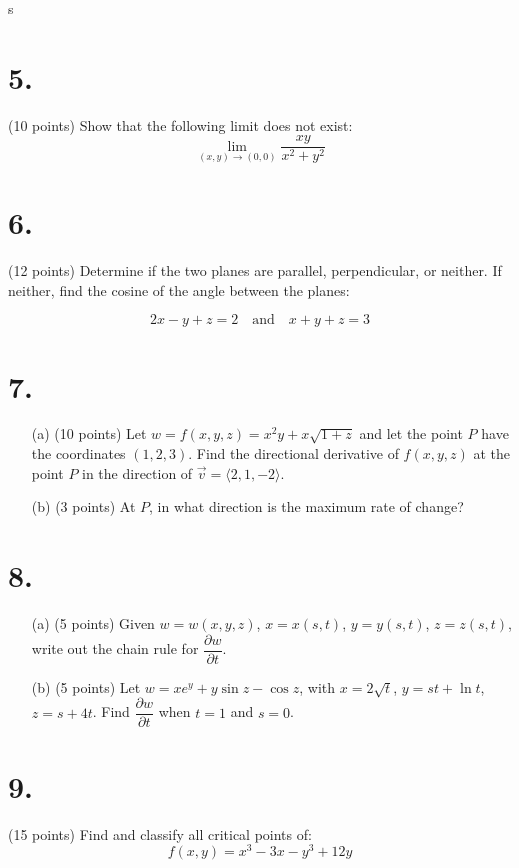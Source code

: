 s\documentclass[12pt]{article}
\begin{document}
\newpage

\section*{5.}
(10 points) Show that the following limit does not exist:
\[
\lim_{(x,y)\to(0,0)} \frac{xy}{x^2 + y^2}
\]

\section*{6.}
(12 points) Determine if the two planes are parallel, perpendicular, or neither. If neither, find the cosine of the angle between the planes:

\[
2x - y + z = 2 \quad \text{and} \quad x + y + z = 3
\]

\newpage

\section*{7.}
\begin{itemize}
    \item[(a)] (10 points) Let $w = f(x, y, z) = x^2y + x\sqrt{1 + z}$ and let the point  $P$ have the coordinates $(1, 2, 3)$. Find the directional derivative of $f(x,y,z)$ at the point $P$ in the direction of $\vec{v} = \langle 2, 1, -2 \rangle$.
    \item[(b)] (3 points) At $P$, in what direction is the maximum rate of change?
\end{itemize}

\newpage

\section*{8.}
\begin{itemize}
    \item[(a)] (5 points) Given $w = w(x, y, z)$, $x = x(s, t)$, $y = y(s, t)$, $z = z(s, t)$, write out the chain rule for $\dfrac{\partial w}{\partial t}$.
    \item[(b)] (5 points) Let $w = x e^y + y\sin z - \cos z$, with $x = 2\sqrt{t}$, $y = st + \ln t$, $z = s + 4t$. Find $\dfrac{\partial w}{\partial t}$ when $t = 1$ and $s = 0$.
\end{itemize}

\newpage

\section*{9.}
(15 points) Find and classify all critical points of:
\[
f(x, y) = x^3 - 3x - y^3 + 12y
\]
\end{document}
